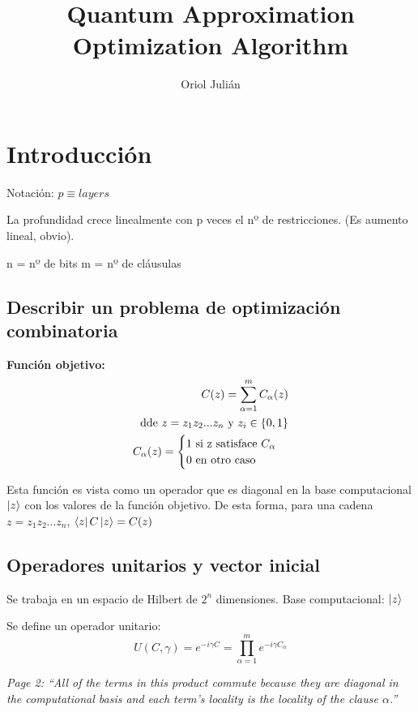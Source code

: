 \documentclass{article}
\title{Quantum Approximation Optimization Algorithm}
\author{Oriol Julián}
\begin{document}
\maketitle{}

\section{Introducción}
\label{sec:qaoa-introduccion}
Notación: \(p \equiv layers\)

La profundidad crece linealmente con p veces el nº de restricciones. (Es aumento lineal, obvio).

n = nº de bits
m = nº de cláusulas

\subsection{Describir un problema de optimización combinatoria}

\textbf{Función objetivo:}
\begin{align*}
  C(z) = \sum_{\alpha = 1}^{m} C_\alpha(z) \\
  \textnormal{ dde } z = z_1z_2...z_n \textnormal{ y } z_i\in \{0, 1\} \\
   C_{\alpha}(z) = \begin{cases}
                     1 \textnormal{ si z satisface } C_\alpha \\
                     0 \textnormal{ en otro caso}
                   \end{cases}
\end{align*}

Esta función es vista como un operador que es diagonal en la base computacional $\ket{z}$ con los valores de la función objetivo. De esta forma, para una cadena $z = z_1z_2...z_n$, $\bra{z}C\ket{z} = C(z)$
\subsection{Operadores unitarios y vector inicial}
Se trabaja en un espacio de Hilbert de $2^n$ dimensiones. Base computacional: $\ket{z}$

Se define un operador unitario:
\[ U(C, \gamma) = e^{-i \gamma C} = \prod_{\alpha = 1}^{m} e^{-i \gamma C_\alpha} \]

\textit{Page 2: ``All of the terms in this product commute because they are diagonal in the computational basis and each term's locality is the locality of the clause $\alpha$.''}
\end{document}
